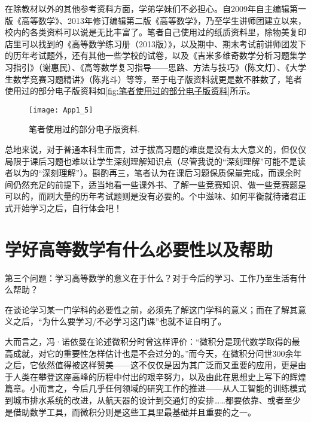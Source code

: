   \hspace*{2em}在除教材以外的其他参考资料方面，学弟学妹们不必担心。自2009年自主编辑第一版《高等数学》、2013年修订编辑第二版《高等数学》，乃至学生讲师团建立以来，校内的各类资料可以说是无比丰富了。笔者自己使用过的纸质资料里，除物美复印店里可以找到的《高等数学练习册（2013版）》，以及期中、期末考试前讲师团发下的历年考试题外，还有其他一些学校的试卷，以及《吉米多维奇数学分析习题集学习指引》（谢惠民）、《高等数学复习指导——思路、方法与技巧》（陈文灯）、《大学生数学竞赛习题精讲》（陈兆斗）等等，至于电子版资料就更是数不胜数了，笔者使用过的部分电子版资料如\autoref{fig:笔者使用过的部分电子版资料}所示。
  \begin{figure}[!htb]
    \centering
    \texttt{[image: App1\_5]}
    \caption{笔者使用过的部分电子版资料.}\label{fig:笔者使用过的部分电子版资料}
  \end{figure}

  \hspace*{2em}总地来说，对于普通本科生而言，过于拔高习题的难度是没有太大意义的，但仅仅局限于课后习题也难以让学生深刻理解知识点（尽管我说的“深刻理解”可能不是读者以为的“深刻理解”）。斟酌再三，笔者认为在课后习题保质保量完成，而课余时间仍然充足的前提下，适当地看一些课外书、了解一些竞赛知识、做一些竞赛题是可以的，而刷大量的历年考试题则是没有必要的。个中滋味、如何平衡就待诸君正式开始学习之后，自行体会吧！

\section{学好高等数学有什么必要性以及帮助}
  \begin{marker}
  {\heiti 第三个问题：学习高等数学的意义在于什么？对于今后的学习、工作乃至生活有什么帮助？}
  \end{marker}

  \hspace*{2em}在谈论学习某一门学科的必要性之前，必须先了解这门学科的意义；而在了解其意义之后，“为什么要学习/不必学习这门课”也就不证自明了。

  \hspace*{2em}大而言之，冯·诺依曼在论述微积分时曾这样评价：“微积分是现代数学取得的最高成就，对它的重要性怎样估计也是不会过分的。”而今天，在微积分问世300余年之后，它依然值得被这样赞美——这不仅仅是因为其广泛而又重要的应用，更是由于人类在攀登这座高峰的历程中付出的艰辛努力，以及由此在思想史上写下的辉煌篇章。小而言之，今后几乎任何领域的研究工作的推进——从人工智能的训练模式到城市排水系统的改进，从航天器的设计到交通灯的安排……都要依靠、或者至少是借助数学工具，而微积分则是这些工具里最基础并且重要的之一。

